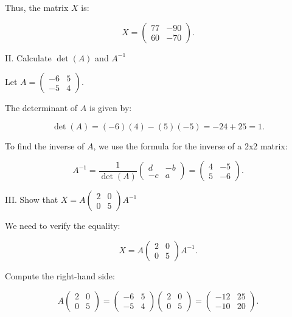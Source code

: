 \documentclass{article}
\begin{document}
	Thus, the matrix \( X \) is:
	
	\[ X = \begin{pmatrix} 77 & -90 \\ 60 & -70 \end{pmatrix}. \]
	
	II. Calculate \( \det(A) \) and \( A^{-1} \)
	
	Let \( A = \begin{pmatrix} -6 & 5 \\ -5 & 4 \end{pmatrix} \).
	
	The determinant of \( A \) is given by:
	
	\[ \det(A) = (-6)(4) - (5)(-5) = -24 + 25 = 1. \]
	
	To find the inverse of \( A \), we use the formula for the inverse of a 2x2 matrix:
	
	\[ A^{-1} = \frac{1}{\det(A)} \begin{pmatrix} d & -b \\ -c & a \end{pmatrix} = \begin{pmatrix} 4 & -5 \\ 5 & -6 \end{pmatrix}. \]
	
	III. Show that \( X = A \begin{pmatrix} 2 & 0 \\ 0 & 5 \end{pmatrix} A^{-1} \)
	
	We need to verify the equality:
	
	\[ X = A \begin{pmatrix} 2 & 0 \\ 0 & 5 \end{pmatrix} A^{-1}. \]
	
	Compute the right-hand side:
	
	\[ A \begin{pmatrix} 2 & 0 \\ 0 & 5 \end{pmatrix} = \begin{pmatrix} -6 & 5 \\ -5 & 4 \end{pmatrix} \begin{pmatrix} 2 & 0 \\ 0 & 5 \end{pmatrix} = \begin{pmatrix} -12 & 25 \\ -10 & 20 \end{pmatrix}. \]
	
\end{document}

